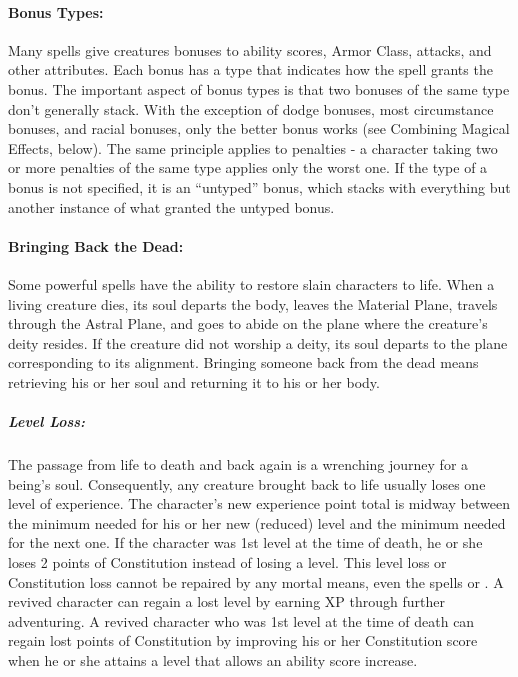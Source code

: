 \paragraph{Bonus Types:} Many spells give creatures bonuses to ability scores, Armor Class, attacks, and other attributes. 
Each bonus has a type that indicates how the spell grants the bonus. 
The important aspect of bonus types is that two bonuses of the same type don't generally stack. 
With the exception of dodge bonuses, most circumstance bonuses, and racial bonuses, only the better bonus works (see Combining Magical Effects, below).
The same principle applies to penalties - a character taking two or more penalties of the same type applies only the worst one.
If the type of a bonus is not specified, it is an ``untyped'' bonus, which stacks with everything but another instance of what granted the untyped bonus.

\paragraph{Bringing Back the Dead:} Some powerful spells have the ability to restore slain characters to life. 
When a living creature dies, its soul departs the body, leaves the Material Plane, travels through the Astral Plane, and goes to abide on the plane where the creature's deity resides. 
If the creature did not worship a deity, its soul departs to the plane corresponding to its alignment. 
Bringing someone back from the dead means retrieving his or her soul and returning it to his or her body.

\subparagraph{Level Loss:} The passage from life to death and back again is a wrenching journey for a being's soul. 
Consequently, any creature brought back to life usually loses one level of experience.
The character's new experience point total is midway between the minimum needed for his or her new (reduced) level and the minimum needed for the next one. 
If the character was 1st level at the time of death, he or she loses 2 points of Constitution instead of losing a level. 
This level loss or Constitution loss cannot be repaired by any mortal means, even the spells  or . 
A revived character can regain a lost level by earning XP through further adventuring. 
A revived character who was 1st level at the time of death can regain lost points of Constitution by improving his or her Constitution score when he or she attains a level that allows an ability score increase.

